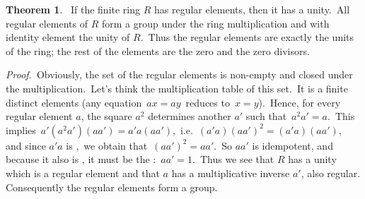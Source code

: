 \documentclass[12pt]{article}
\theoremstyle{definition}
\newtheorem*{thmplain}{Theorem}
\begin{document}
\begin{thmplain}
\, If the finite ring $R$ has regular elements, then it has a unity.\, All regular elements of $R$ form a group under the ring multiplication and with identity element the unity of $R$.\, Thus the regular elements are exactly the units of the ring; the rest of the elements are the zero and the zero divisors.
\end{thmplain}

{\em Proof.}\, Obviously, the set of the regular elements is non-empty and closed under the multiplication.\, Let's think the multiplication table of this set.\, It is a finite  distinct elements (any equation\, $ax = ay$\, reduces to\, $x = y$).\, Hence, for every regular element $a$, the square $a^2$ determines another $a'$ such that\, $a^2a' = a$.\, This implies\, $a'(a^2a')(aa') = a'a(aa')$,\, i.e.\, $(a'a)(aa')^2 = (a'a)(aa')$,\, and since $a'a$ is ,\, we obtain that\, $(aa')^2 = aa'$.\, So $aa'$ is idempotent, and because it also is , it must be the :\, $aa' = 1$.\, Thus we see that $R$ has a unity which is a regular element and that $a$ has a multiplicative inverse $a'$, also regular.\, Consequently the regular elements form a group.
\end{document}
